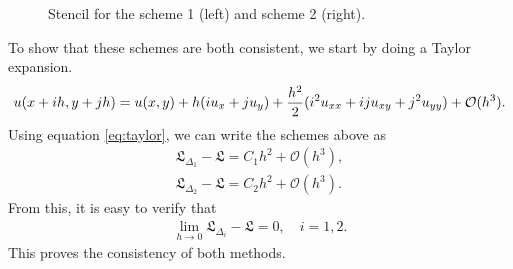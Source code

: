 \documentclass[10pt,a4paper,twoside, french]{article}
\numberwithin{equation}{section}
\numberwithin{figure}{section}
\numberwithin{table}{section}
\begin{document}
\begin{enumerate}
\begin{enumerate}[a.]
\begin{figure}[h]
\caption{Stencil for the scheme 1 (left) and scheme 2 (right).}
\end{figure}
To show that these schemes are both consistent, we start by doing a Taylor expansion.
\begin{align}
u(x+ih,y+jh) = u(x,y) +h(iu_x+ju_y)+\dfrac{h^2}{2}(i^2u_{xx}+iju_{xy}+j^2u_{yy})+{\cal{O}}(h^3).
\label{eq:taylor}
\end{align}
Using equation \eqref{eq:taylor}, we can write the schemes above as
\begin{align}
\mathfrak{L}_{\Delta_1}-\mathfrak{L} =  C_1h^2 + \mathcal{O}(h^3),\\
\mathfrak{L}_{\Delta_2}-\mathfrak{L} =  C_2h^2 + \mathcal{O}(h^3).
\end{align}
From this, it is easy to verify that 
\begin{align*}
\lim_{h\to0}\mathfrak{L}_{\Delta_i}-\mathfrak{L} = 0, \quad i=1,2.
\end{align*}
This proves the consistency of both methods.

\end{enumerate}


\end{enumerate}
	
	
	
	
\end{document}
